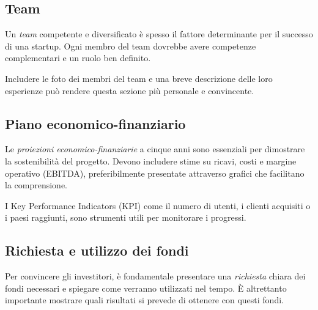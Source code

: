 \subsection*{Team}
Un \textit{team} competente e diversificato è spesso il fattore determinante per il successo di una startup. Ogni membro del team dovrebbe avere competenze complementari e un ruolo ben definito. 

Includere le foto dei membri del team e una breve descrizione delle loro esperienze può rendere questa sezione più personale e convincente.

\subsection*{Piano economico-finanziario}
Le \textit{proiezioni economico-finanziarie} a cinque anni sono essenziali per dimostrare la sostenibilità del progetto. Devono includere stime su ricavi, costi e margine operativo (EBITDA), preferibilmente presentate attraverso grafici che facilitano la comprensione.

I Key Performance Indicators (KPI) come il numero di utenti, i clienti acquisiti o i paesi raggiunti, sono strumenti utili per monitorare i progressi.

\subsection*{Richiesta e utilizzo dei fondi}
Per convincere gli investitori, è fondamentale presentare una \textit{richiesta} chiara dei fondi necessari e spiegare come verranno utilizzati nel tempo.
È altrettanto importante mostrare quali risultati si prevede di ottenere con questi fondi.


